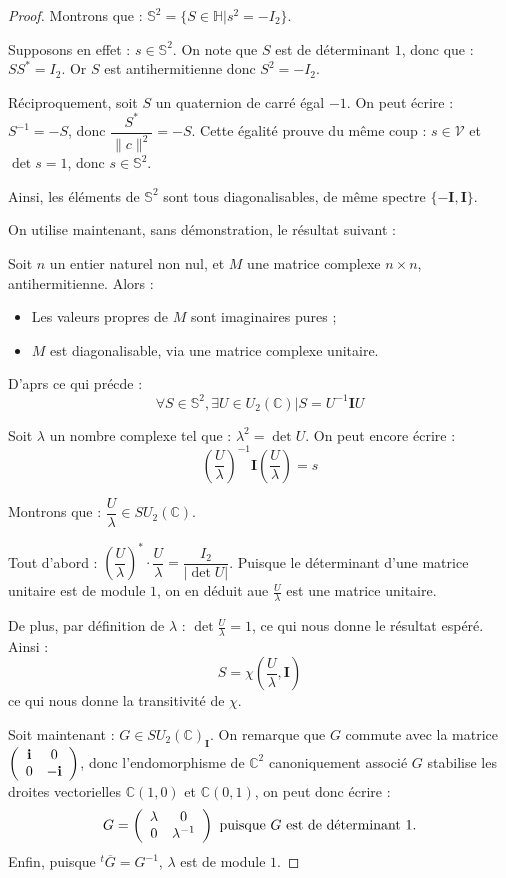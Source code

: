 \begin{proof}
Montrons que : $\mathbb{S}^2=\{S\in\mathbb{H}|s^2=-I_2\}$.
\par
Supposons en effet : $s\in\mathbb{S}^2$. On note que $S$ est de d\'eterminant $1$, donc que : $SS^{\ast}=I_2$. Or $S$ est antihermitienne donc $S^2=-I_2$.
\par
R\'eciproquement, soit $S$ un quaternion de carr\'e \'egal  $-1$. On peut \'ecrire : $S^{-1}=-S$, donc $\dfrac{S^{\ast}}{\|c\|^2}=-S$. %
Cette \'egalit\'e prouve du m\^eme coup : $s\in\mathcal{V}$ et $\det s=1$, donc $s\in\mathbb{S}^2$.
\par
Ainsi, les \'el\'ements de $\mathbb{S}^2$ sont tous diagonalisables, de m\^eme spectre $\{-\mathbf{I},\mathbf{I}\}$.
\par
On utilise maintenant, sans d\'emonstration, le r\'esultat suivant :

\begin{prop}
Soit $n$ un entier naturel non nul, et $M$ une matrice complexe $n\times n$, antihermitienne. Alors :
\begin{itemize}
\item Les valeurs propres de $M$ sont imaginaires pures ;
\item $M$ est diagonalisable, via une matrice complexe unitaire.
\end{itemize}
\end{prop}

D'aprs ce qui pr\'ecde :
\[\forall S\in\mathbb{S}^2,\exists U\in U_2(\mathbb{C})|S=U^{-1}\mathbf{I}U\]

Soit $\lambda$ un nombre complexe tel que : $\lambda^2=\det U$. On peut encore \'ecrire :
\[\left(\dfrac{U}{\lambda}\right)^{-1}\mathbf{I}\left(\dfrac{U}{\lambda}\right)=s\]

Montrons que : $\dfrac{U}{\lambda}\in SU_2(\mathbb{C})$.

\par
Tout d'abord : $\left(\dfrac{U}{\lambda}\right)^{\ast}\cdot\dfrac{U}{\lambda}=\dfrac{I_2}{|\det U|}$. %
Puisque le d\'eterminant d'une matrice unitaire est de module $1$, on en d\'eduit aue $\frac{U}{\lambda}$ est une matrice unitaire.

\par
De plus, par d\'efinition de $\lambda$ : $\det \frac{U}{\lambda}=1$, ce qui nous donne le r\'esultat esp\'er\'e. Ainsi :
\[S=\chi\left(\frac{U}{\lambda},\mathbf{I}\right)\]
ce qui nous donne la transitivit\'e de $\chi$.

\par
Soit maintenant : $G\in SU_2(\mathbb{C})_{\mathbf{I}}$. On remarque que $G$ commute avec la matrice $\left(\begin{array}{cc}\mathbf{i}&0\\0&-\mathbf{i}\end{array}\right)$, %
donc l'endomorphisme de $\mathbb{C}^2$ canoniquement associ\'e  $G$ stabilise les droites vectorielles $\mathbb{C}(1,0)$ et $\mathbb{C}(0,1)$, %
on peut donc \'ecrire :
\[G=\left(\begin{array}{cc}\lambda&0\\0&\lambda^{-1}\end{array}\right)\text{ puisque $G$ est de d\'eterminant $1$.}\]
Enfin, puisque $^t\overline{G}=G^{-1}$, $\lambda$ est de module $1$.


\end{proof}
